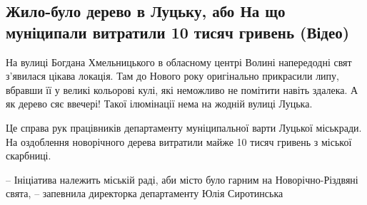  
 
 
 
 
\subsection{Жило-було дерево в Луцьку, або На що муніципали витратили 10 тисяч гривень (Відео)}
\label{sec:21_12_2021.stz.news.ua.volyn.1.derevo_luck}


На вулиці Богдана Хмельницького в обласному центрі Волині напередодні свят
з’явилася цікава локація. Там до Нового року оригінально прикрасили липу,
вбравши її у великі кольорові кулі, які неможливо не помітити навіть здалека. А
як дерево сяє ввечері! Такої ілюмінації нема на жодній вулиці Луцька.

Це справа рук працівників департаменту муніципальної варти Луцької міськради.
На оздоблення новорічного дерева витратили майже 10 тисяч гривень з міської
скарбниці. 

– Ініціатива належить міській раді, аби місто було гарним на Новорічно-Різдвяні
свята, – запевнила директорка департаменту Юлія Сиротинська

